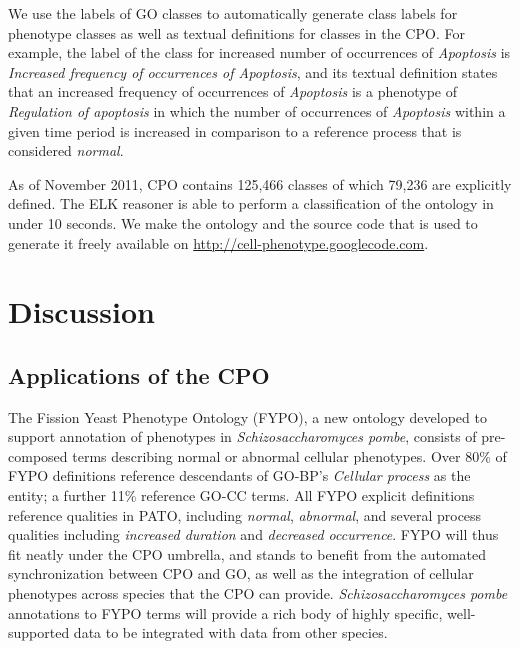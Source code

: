 \documentclass{bioinfo}
\renewcommand{\cite}{\citep}
\begin{document}
We use the labels of GO classes to automatically generate class labels
for phenotype classes as well as textual definitions for classes in
the CPO. For example, the label of the class for increased number of
occurrences of {\em Apoptosis} is {\em Increased frequency of
  occurrences of Apoptosis}, and its textual definition states that an
increased frequency of occurrences of {\em Apoptosis} is a phenotype
of {\em Regulation of apoptosis} in which the number of occurrences of
{\em Apoptosis} within a given time period is increased in comparison
to a reference process that is considered {\em normal}.

As of November 2011, CPO contains 125,466 classes of which 79,236 are
explicitly defined.  The ELK reasoner \cite{Kazakov2011} is able to
perform a classification of the ontology in under 10 seconds. We make
the ontology and the source code that is used to generate it freely
available on \url{http://cell-phenotype.googlecode.com}.

\section{Discussion}
\subsection{Applications of the CPO}
The Fission Yeast Phenotype Ontology (FYPO), a new ontology developed
to support annotation of phenotypes in {\em Schizosaccharomyces
  pombe}, consists of pre-composed terms describing normal or abnormal
cellular phenotypes. Over 80\% of FYPO definitions reference
descendants of GO-BP's {\em Cellular process} as the entity; a further
11\% reference GO-CC terms. All FYPO explicit definitions reference
qualities in PATO, including {\em normal}, {\em abnormal}, and several
process qualities including {\em increased duration} and {\em
  decreased occurrence}. FYPO will thus fit neatly under the CPO
umbrella, and stands to benefit from the automated synchronization
between CPO and GO, as well as the integration of cellular phenotypes
across species that the CPO can provide. {\em Schizosaccharomyces
  pombe} annotations to FYPO terms will provide a rich body of highly
specific, well-supported data to be integrated with data from other
species.
\end{document}
